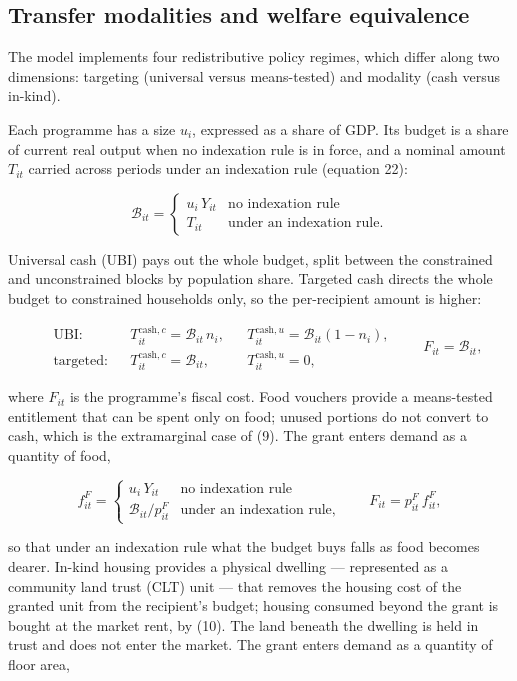\documentclass[preprint,review,12pt]{elsarticle}
\begin{document}
\subsection{Transfer modalities and welfare equivalence}

The model implements four redistributive policy regimes, which differ
along two dimensions: targeting (universal versus means-tested) and
modality (cash versus in-kind).

Each programme has a size \(u_i\), expressed as a share of GDP. Its
budget is a share of current real output when no indexation rule is in
force, and a nominal amount \(T_{it}\) carried across periods under an
indexation rule (equation 22):

\[\mathcal{B}_{it} = \begin{cases} u_i \, Y_{it} & \text{no indexation rule} \\ T_{it} & \text{under an indexation rule.} \end{cases} \tag{15}\]

Universal cash (UBI) pays out the whole budget, split between the
constrained and unconstrained blocks by population share. Targeted cash
directs the whole budget to constrained households only, so the
per-recipient amount is higher:

\[\begin{aligned} &\text{UBI:} && T^{\mathrm{cash},c}_{it} = \mathcal{B}_{it} \, n_i, && T^{\mathrm{cash},u}_{it} = \mathcal{B}_{it} (1 - n_i), \\ &\text{targeted:} && T^{\mathrm{cash},c}_{it} = \mathcal{B}_{it}, && T^{\mathrm{cash},u}_{it} = 0, \end{aligned} \qquad F_{it} = \mathcal{B}_{it}, \tag{16}\]

where \(F_{it}\) is the programme's fiscal cost. Food vouchers provide a
means-tested entitlement that can be spent only on food; unused portions
do not convert to cash, which is the extramarginal case of (9). The
grant enters demand as a quantity of food,

\[f^F_{it} = \begin{cases} u_i \, Y_{it} & \text{no indexation rule} \\ \mathcal{B}_{it} / p^F_{it} & \text{under an indexation rule,} \end{cases} \qquad F_{it} = p^F_{it} \, f^F_{it}, \tag{17}\]

so that under an indexation rule what the budget buys falls as food
becomes dearer. In-kind housing provides a physical dwelling ---
represented as a community land trust (CLT) unit --- that removes the
housing cost of the granted unit from the recipient's budget; housing
consumed beyond the grant is bought at the market rent, by (10). The
land beneath the dwelling is held in trust and does not enter the
market. The grant enters demand as a quantity of floor area,
\end{document}
